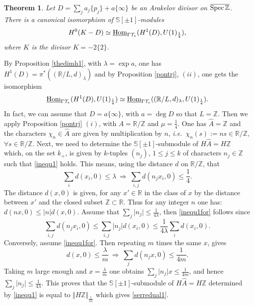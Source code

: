 \documentclass[cupthm]{CUP-JNL-JMJ}
\numberwithin{equation}{section}
\theoremstyle{cupplain}
\newtheorem{theorem}{Theorem}[section]
\theoremstyle{cupdefinition}
\theoremstyle{cupremark}
\theoremstyle{cupproof}
\def\R{{\mathbb R}}
\def\S{{\mathbb S}}
\def\Z{{\mathbb Z}}
\def\cT{{\mathcal T}}
\def\Spec{{\rm Spec\,}}
\def\sss{{\S}}
\def\spm{{\sss[\pm 1]}}
\def\Hom {{\rm{Hom}}}
\def\spzb{{\overline{\Spec\Z}}}
\def\uhom{{\underline \Hom}}
\newcommand{\ie}{{\it i.e.\/}\ }
\begin{document}
	
\begin{theorem}\label{serredual} Let $D=\sum_j a_j\{p_j\} + a\{\infty\}$ be an Arakelov divisor  on $\spzb$.  There is a canonical isomorphism of $\spm$-modules 
\begin{equation}\label{serredual1}
H^0(K-D)\simeq \uhom_{\Gamma\cT_*}(H^1(D),U(1)_{\frac 14}),
\end{equation}
where $K$ is the divisor   $K=-2\{2\}$.
\end{theorem}
\proof By Proposition \ref{thedimh1},  with $\lambda=\exp a$, one has $H^1(D)=\pi^*((\R/L,d)_\lambda)$ and by  Proposition \ref{pontrj}, $(ii)$, one gets the isomorphism 
\[
\uhom_{\Gamma\cT_*}(H^1(D),U(1)_{\frac 14})\simeq \uhom_{\Gamma\cT_*}((\R/L,d)_\lambda,U(1)_{\frac 14}).
\]
In fact, we can assume that $D=a \{\infty\}$, with $a=\deg D$ so that $L=\Z$. Then we apply Proposition \ref{pontrj} $(i)$, with $A=\R/\Z$ and $\mu=\frac 14$. One has $\widehat A=\Z$ and the characters $\chi_n\in \widehat A$ are given by multiplication by $n$, \ie $\chi_n(s):=ns\in \R/\Z$, $\forall s\in \R/\Z$. Next, we need to determine the $\spm$-submodule of $H\widehat A=H\Z$ which, on the set $k_+$, is given by $k$-tuples $(n_j)$, $1\leq j\leq k$ of  characters  
	$n_j\in \Z$ such that \eqref{inequ1} holds. This means, using the distance $d$ on $\R/\Z$, that
	\begin{equation}\label{inequ1for}
	\sum_i d (x_{i},0) \leq \lambda~ \Rightarrow ~\sum_{i,j} d( n_j x_{i},0) \leq \frac 14.
	\end{equation}
	The distance $d(x,0)$ is given, for any $x'\in \R$ in the class of $x$ by the distance between $x'$ and the closed subset $\Z\subset \R$. Thus for any integer $n$ one has: $d(nx,0)\leq \vert n\vert d(x,0)$. Assume that $\sum_j \vert n_j\vert \leq \frac{1}{4\lambda}$, then  \eqref{inequ1for} follows since
	\[
	\sum_{i,j} d( n_j x_{i},0)\leq \sum_{i,j} \vert n_j\vert d( x_{i},0)\leq \frac{1}{4\lambda}\sum_i d (x_{i},0).
	\]
	Conversely, assume  \eqref{inequ1for}. Then repeating $m$ times the same $x$,  gives  
	\[
	 d (x,0) \leq \frac\lambda m ~\Rightarrow ~\sum_{j} d( n_j x,0) \leq \frac {1}{4m}.
	\]
 Taking $m$ large enough and  $x=\frac\lambda m$ one obtains $\sum_{j} \vert n_j \vert x\leq \frac {1}{4m}$, and hence $\sum_j \vert n_j\vert \leq \frac{1}{4\lambda}$. This proves that the $\spm$-submodule of $H\widehat A=H\Z$ determined by  \eqref{inequ1} is equal to $\Vert H\Z\Vert_{\frac{1}{4\lambda}}$ which gives \eqref{serredual1}.\endproof 
 
\end{document}
